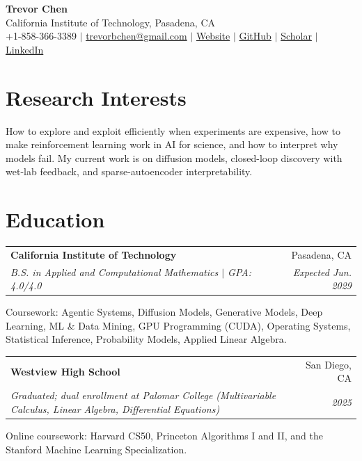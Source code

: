 \documentclass[letterpaper,10pt]{article}
\makeatletter
\newif\ifafterhead
\newcommand{\cvEntry}[4]{%
  \par\ifafterhead\vspace{5.2pt}\else\vspace{5pt}\fi\global\afterheadfalse\hspace*{0.15in}%
  \begin{tabular*}{0.97\textwidth}[t]{l@{\extracolsep{\fill}}r}
    \textbf{#1} & #2 \\
    \textit{\small #3} & \textit{\small #4} \\
  \end{tabular*}\par\nopagebreak\vspace{-0.2pt}\nopagebreak}
\makeatother
\begin{document}
\begin{center}
  {\Huge\textbf{Trevor Chen}} \\ \vspace{5.6pt}
  {\small California Institute of Technology, Pasadena, CA} \\ \vspace{3pt}
  {\small +1-858-366-3389 $|$ \href{mailto:trevorbchen@gmail.com}{trevorbchen@gmail.com} $|$
  \href{https://trevorbchen.github.io/Website/}{Website} $|$
  \href{https://github.com/trevorbchen}{GitHub} $|$
  \href{https://scholar.google.com/citations?user=N_DNZMUAAAAJ}{Scholar} $|$
  \href{https://www.linkedin.com/in/trevorbchen/}{LinkedIn}}
\end{center}
\vspace{-9.9pt}

\section{Research Interests}
How to explore and exploit efficiently when experiments are expensive, how to make reinforcement learning work in AI for science, and how to interpret why models fail. My current work is on diffusion models, closed-loop discovery with wet-lab feedback, and sparse-autoencoder interpretability.

\section{Education}
\cvEntry{California Institute of Technology}{Pasadena, CA}
  {B.S. in Applied and Computational Mathematics $|$ GPA: 4.0/4.0}{Expected Jun. 2029}
\begin{cvBody}
Coursework: Agentic Systems, Diffusion Models, Generative Models, Deep Learning, ML \& Data Mining, GPU Programming (CUDA), Operating Systems, Statistical Inference, Probability Models, Applied Linear Algebra.
\end{cvBody}

\cvEntry{Westview High School}{San Diego, CA}
  {Graduated; dual enrollment at Palomar College (Multivariable Calculus, Linear Algebra, Differential Equations)}{2025}
\begin{cvBody}
Online coursework: Harvard CS50, Princeton Algorithms I and II, and the Stanford Machine Learning Specialization.
\end{cvBody}

\end{document}

